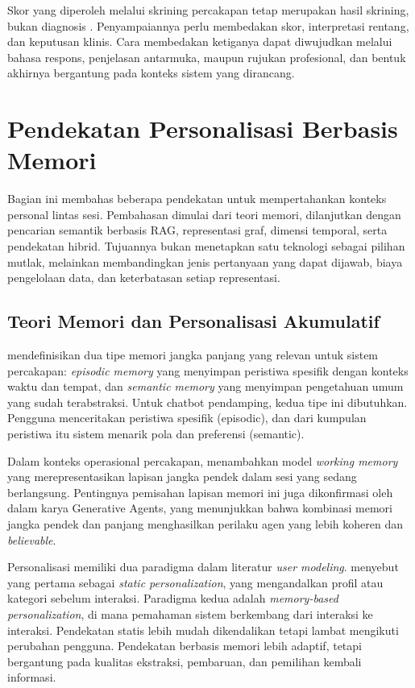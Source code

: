 Skor yang diperoleh melalui skrining percakapan tetap merupakan hasil skrining, bukan diagnosis \parencite{kroenke2001phq9}. Penyampaiannya perlu membedakan skor, interpretasi rentang, dan keputusan klinis. Cara membedakan ketiganya dapat diwujudkan melalui bahasa respons, penjelasan antarmuka, maupun rujukan profesional, dan bentuk akhirnya bergantung pada konteks sistem yang dirancang.

\section{Pendekatan Personalisasi Berbasis Memori}
\label{sec:kg}

Bagian ini membahas beberapa pendekatan untuk mempertahankan konteks personal lintas sesi. Pembahasan dimulai dari teori memori, dilanjutkan dengan pencarian semantik berbasis RAG, representasi graf, dimensi temporal, serta pendekatan hibrid. Tujuannya bukan menetapkan satu teknologi sebagai pilihan mutlak, melainkan membandingkan jenis pertanyaan yang dapat dijawab, biaya pengelolaan data, dan keterbatasan setiap representasi.

\subsection{Teori Memori dan Personalisasi Akumulatif}
\label{subsec:teori-memori}

\textcite{tulving1972} mendefinisikan dua tipe memori jangka panjang yang relevan untuk sistem percakapan: \textit{episodic memory} yang menyimpan peristiwa spesifik dengan konteks waktu dan tempat, dan \textit{semantic memory} yang menyimpan pengetahuan umum yang sudah terabstraksi. Untuk chatbot pendamping, kedua tipe ini dibutuhkan. Pengguna menceritakan peristiwa spesifik (episodic), dan dari kumpulan peristiwa itu sistem menarik pola dan preferensi (semantic).

Dalam konteks operasional percakapan, \textcite{baddeley1992} menambahkan model \textit{working memory} yang merepresentasikan lapisan jangka pendek dalam sesi yang sedang berlangsung. Pentingnya pemisahan lapisan memori ini juga dikonfirmasi oleh \textcite{park2023generative} dalam karya Generative Agents, yang menunjukkan bahwa kombinasi memori jangka pendek dan panjang menghasilkan perilaku agen yang lebih koheren dan \textit{believable}.

Personalisasi memiliki dua paradigma dalam literatur \textit{user modeling}. \textcite{fischer2001} menyebut yang pertama sebagai \textit{static personalization}, yang mengandalkan profil atau kategori sebelum interaksi. Paradigma kedua adalah \textit{memory-based personalization}, di mana pemahaman sistem berkembang dari interaksi ke interaksi. Pendekatan statis lebih mudah dikendalikan tetapi lambat mengikuti perubahan pengguna. Pendekatan berbasis memori lebih adaptif, tetapi bergantung pada kualitas ekstraksi, pembaruan, dan pemilihan kembali informasi.

